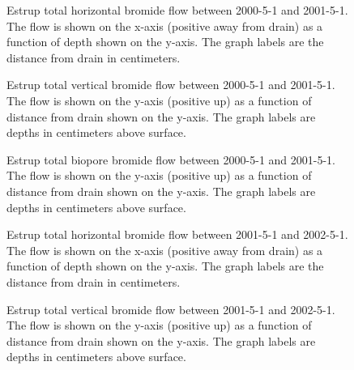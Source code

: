 \begin{figure}[htbp]
  \centering
  
  \caption{Estrup total horizontal bromide flow between 2000-5-1 and
    2001-5-1.  The flow is shown on the x-axis (positive away from
    drain) as a function of depth shown on the y-axis.  The graph
    labels are the distance from drain in centimeters.}
  \label{fig:Estrup-Bromide-2000-horizontal}
\end{figure}\FloatBarrier

\begin{figure}[htbp]
  \centering
  
  \caption{Estrup total vertical bromide flow between 2000-5-1 and
    2001-5-1.  The flow is shown on the y-axis (positive up) as a
    function of distance from drain shown on the y-axis.  The graph
    labels are depths in centimeters above surface.}
  \label{fig:Estrup-Bromide-2000-vertical}
\end{figure}\FloatBarrier

\begin{figure}[htbp]
  \centering
  
  \caption{Estrup total biopore bromide flow between 2000-5-1 and
    2001-5-1.  The flow is shown on the y-axis (positive up) as a
    function of distance from drain shown on the y-axis.  The graph
    labels are depths in centimeters above surface.}
  \label{fig:Estrup-Bromide-biopore-2000}
\end{figure}\FloatBarrier

\begin{figure}[htbp]
  \centering
  
  \caption{Estrup total horizontal bromide flow between 2001-5-1 and
    2002-5-1.  The flow is shown on the x-axis (positive away from
    drain) as a function of depth shown on the y-axis.  The graph
    labels are the distance from drain in centimeters.}
  \label{fig:Estrup-Bromide-2001-horizontal}
\end{figure}\FloatBarrier

\begin{figure}[htbp]
  \centering
  
  \caption{Estrup total vertical bromide flow between 2001-5-1 and
    2002-5-1.  The flow is shown on the y-axis (positive up) as a
    function of distance from drain shown on the y-axis.  The graph
    labels are depths in centimeters above surface.}
  \label{fig:Estrup-Bromide-2001-vertical}
\end{figure}\FloatBarrier

